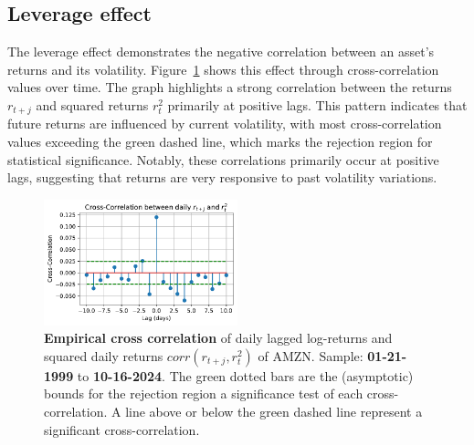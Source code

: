 \documentclass{article}
\begin{document}
\subsection{Leverage effect}

The leverage effect demonstrates the negative correlation between an asset's returns and its volatility. Figure~\ref{fig:Rolling_std_dev_2} shows this effect through cross-correlation values over time. The graph highlights a strong correlation between the returns \( r_{t+j} \) and squared returns \( r_{t}^2 \) primarily at positive lags. This pattern indicates that future returns are influenced by current volatility, with most cross-correlation values exceeding the green dashed line, which marks the rejection region for statistical significance. Notably, these correlations primarily occur at positive lags, suggesting that returns are very responsive to past volatility variations.


\begin{figure}[H]
    \centering
    \includegraphics[width=0.5\textwidth]{Img/Fact8_CrossCorr_r_r2.pdf}
    \caption{\textbf{Empirical cross correlation} of daily lagged log-returns and squared daily returns $corr(r_{t+j},r_t^2)$ of AMZN. Sample: \textbf{01-21-1999} to \textbf{10-16-2024}. 
    The green dotted bars are the (asymptotic) bounds for the rejection region a significance test of each cross-correlation. A line above or below the green dashed line represent a significant cross-correlation.}
    \label{fig:Rolling_std_dev_2}
\end{figure}
\end{document}
